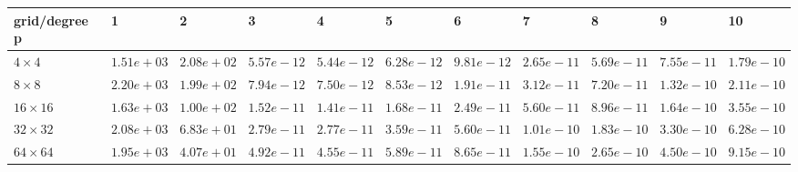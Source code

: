 \begin{tabular}{lllllllllll}
\hline
 grid/degree p   & 1          & 2          & 3          & 4          & 5          & 6          & 7          & 8          & 9          & 10         \\
\hline
 $4 \times 4$    & $1.51e+03$ & $2.08e+02$ & $5.57e-12$ & $5.44e-12$ & $6.28e-12$ & $9.81e-12$ & $2.65e-11$ & $5.69e-11$ & $7.55e-11$ & $1.79e-10$ \\
 $8 \times 8$    & $2.20e+03$ & $1.99e+02$ & $7.94e-12$ & $7.50e-12$ & $8.53e-12$ & $1.91e-11$ & $3.12e-11$ & $7.20e-11$ & $1.32e-10$ & $2.11e-10$ \\
 $16 \times 16$  & $1.63e+03$ & $1.00e+02$ & $1.52e-11$ & $1.41e-11$ & $1.68e-11$ & $2.49e-11$ & $5.60e-11$ & $8.96e-11$ & $1.64e-10$ & $3.55e-10$ \\
 $32 \times 32$  & $2.08e+03$ & $6.83e+01$ & $2.79e-11$ & $2.77e-11$ & $3.59e-11$ & $5.60e-11$ & $1.01e-10$ & $1.83e-10$ & $3.30e-10$ & $6.28e-10$ \\
 $64 \times 64$  & $1.95e+03$ & $4.07e+01$ & $4.92e-11$ & $4.55e-11$ & $5.89e-11$ & $8.65e-11$ & $1.55e-10$ & $2.65e-10$ & $4.50e-10$ & $9.15e-10$ \\
\hline
\end{tabular}
